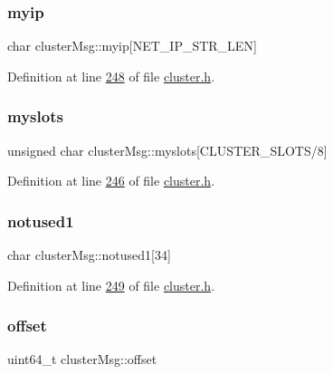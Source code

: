 \subsubsection{\texorpdfstring{myip}{myip}}
{\footnotesize\ttfamily char cluster\+Msg\+::myip\mbox{[}N\+E\+T\+\_\+\+I\+P\+\_\+\+S\+T\+R\+\_\+\+L\+EN\mbox{]}}



Definition at line \hyperlink{cluster_8h_source_l00248}{248} of file \hyperlink{cluster_8h_source}{cluster.\+h}.

\mbox{\label{structclusterMsg_a399581369cf6bda15a4ff0d06d72a119}} 
\subsubsection{\texorpdfstring{myslots}{myslots}}
{\footnotesize\ttfamily unsigned char cluster\+Msg\+::myslots\mbox{[}C\+L\+U\+S\+T\+E\+R\+\_\+\+S\+L\+O\+TS/8\mbox{]}}



Definition at line \hyperlink{cluster_8h_source_l00246}{246} of file \hyperlink{cluster_8h_source}{cluster.\+h}.

\mbox{\label{structclusterMsg_a8f272476209e87783b2585bda0627912}} 
\subsubsection{\texorpdfstring{notused1}{notused1}}
{\footnotesize\ttfamily char cluster\+Msg\+::notused1\mbox{[}34\mbox{]}}



Definition at line \hyperlink{cluster_8h_source_l00249}{249} of file \hyperlink{cluster_8h_source}{cluster.\+h}.

\mbox{\label{structclusterMsg_aa79837822db47e45154fc4ee08e3f246}} 
\subsubsection{\texorpdfstring{offset}{offset}}
{\footnotesize\ttfamily uint64\+\_\+t cluster\+Msg\+::offset}



